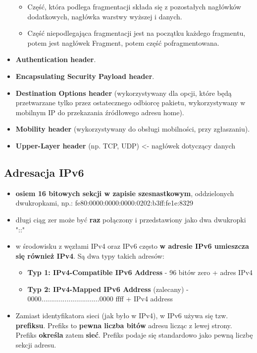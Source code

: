 \documentclass[../main.tex]{subfiles}
\begin{document}
\begin{itemize}
\begin{itemize}
            \item Część, która podlega fragmentacji składa się z pozostałych nagłówków dodatkowych, nagłówka warstwy wyższej i danych.
            \item Część niepodlegająca fragmentacji jest na początku każdego fragmentu, potem jest nagłówek Fragment, potem część pofragmentowana.
        \end{itemize}
        \item \textbf{Authentication header}.
        \item \textbf{Encapsulating Security Payload header}.
        \item \textbf{Destination Options header} (wykorzystywany dla opcji, które będą przetwarzane tylko przez ostatecznego odbiorcę pakietu, wykorzystywany w mobilnym IP do przekazania źródłowego adresu home).
        \item \textbf{Mobility header} (wykorzystywany do obsługi mobilności, przy zgłaszaniu).
        \item \textbf{Upper-Layer header} (np. TCP, UDP) <- nagłówek dotyczący danych
    \end{itemize}

    \subsection{Adresacja IPv6}
    \begin{itemize}
        \item \textbf{osiem 16 bitowych sekcji w zapisie szesnastkowym}, oddzielonych dwukropkami,
        np.: fe80:0000:0000:0000:0202:b3ff:fe1e:8329
        \item długi ciąg zer może być \textbf{raz} połączony i przedstawiony jako dwa dwukropki "::"
        \item w środowisku z węzłami IPv4 oraz IPv6 często \textbf{w adresie IPv6 umieszcza się również IPv4}. Są dwa typy takich adresów:
        \begin{itemize}
            \item \textbf{Typ 1: IPv4-Compatible IPv6 Address} - 96 bitów zero + adres IPv4
            \item \textbf{Typ 2: IPv4-Mapped IPv6 Address} (zalecany) - $0000..............................0000$ ffff + IPv4 address
        \end{itemize}
        \item Zamiast identyfikatora sieci (jak było w IPv4), w IPv6 używa się tzw. \textbf{prefiksu}. Prefiks to \textbf{pewna liczba bitów} adresu licząc z lewej strony. Prefiks \textbf{określa} zatem \textbf{sieć}. Prefiks podaje się standardowo jako pewną liczbę sekcji adresu.
    \end{itemize}
\end{document}
